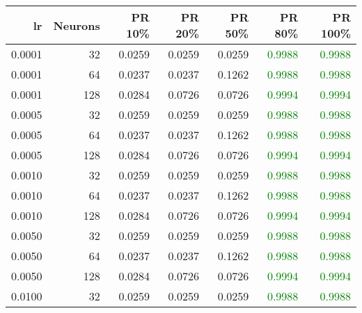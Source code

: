 \begin{tabular}{rrrrrrr}
\toprule
lr & Neurons & PR 10\% & PR 20\% & PR 50\% & PR 80\% & PR 100\% \\
\midrule
0.0001 & 32 & \textcolor{blu} {0.0259} & \textcolor{blu} {0.0259} & \textcolor{blu} {0.0259} & \textcolor{green} {0.9988} & \textcolor{green} {0.9988} \\
0.0001 & 64 & \textcolor{blu} {0.0237} & \textcolor{blu} {0.0237} & \textcolor{blu} {0.1262} & \textcolor{green} {0.9988} & \textcolor{green} {0.9988} \\
0.0001 & 128 & \textcolor{blu} {0.0284} & \textcolor{blu} {0.0726} & \textcolor{blu} {0.0726} & \textcolor{green} {0.9994} & \textcolor{green} {0.9994} \\
0.0005 & 32 & \textcolor{blu} {0.0259} & \textcolor{blu} {0.0259} & \textcolor{blu} {0.0259} & \textcolor{green} {0.9988} & \textcolor{green} {0.9988} \\
0.0005 & 64 & \textcolor{blu} {0.0237} & \textcolor{blu} {0.0237} & \textcolor{blu} {0.1262} & \textcolor{green} {0.9988} & \textcolor{green} {0.9988} \\
0.0005 & 128 & \textcolor{blu} {0.0284} & \textcolor{blu} {0.0726} & \textcolor{blu} {0.0726} & \textcolor{green} {0.9994} & \textcolor{green} {0.9994} \\
0.0010 & 32 & \textcolor{blu} {0.0259} & \textcolor{blu} {0.0259} & \textcolor{blu} {0.0259} & \textcolor{green} {0.9988} & \textcolor{green} {0.9988} \\
0.0010 & 64 & \textcolor{blu} {0.0237} & \textcolor{blu} {0.0237} & \textcolor{blu} {0.1262} & \textcolor{green} {0.9988} & \textcolor{green} {0.9988} \\
0.0010 & 128 & \textcolor{blu} {0.0284} & \textcolor{blu} {0.0726} & \textcolor{blu} {0.0726} & \textcolor{green} {0.9994} & \textcolor{green} {0.9994} \\
0.0050 & 32 & \textcolor{blu} {0.0259} & \textcolor{blu} {0.0259} & \textcolor{blu} {0.0259} & \textcolor{green} {0.9988} & \textcolor{green} {0.9988} \\
0.0050 & 64 & \textcolor{blu} {0.0237} & \textcolor{blu} {0.0237} & \textcolor{blu} {0.1262} & \textcolor{green} {0.9988} & \textcolor{green} {0.9988} \\
0.0050 & 128 & \textcolor{blu} {0.0284} & \textcolor{blu} {0.0726} & \textcolor{blu} {0.0726} & \textcolor{green} {0.9994} & \textcolor{green} {0.9994} \\
0.0100 & 32 & \textcolor{blu} {0.0259} & \textcolor{blu} {0.0259} & \textcolor{blu} {0.0259} & \textcolor{green} {0.9988} & \textcolor{green} {0.9988} \\

\end{tabular}
